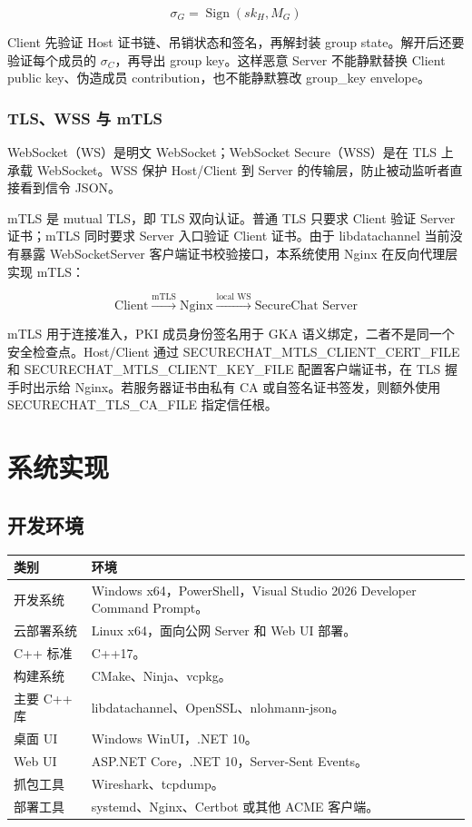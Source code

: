 \documentclass[UTF8,a4paper,12pt]{ctexart}
\begin{document}
\[
\sigma_G = \operatorname{Sign}(sk_H, M_G)
\]

Client 先验证 Host 证书链、吊销状态和签名，再解封装 group state。解开后还要验证每个成员的 \(\sigma_C\)，再导出 group key。这样恶意 Server 不能静默替换 Client public key、伪造成员 contribution，也不能静默篡改 group\_key envelope。

\subsubsection{TLS、WSS 与 mTLS}

WebSocket（WS）是明文 WebSocket；WebSocket Secure（WSS）是在 TLS 上承载 WebSocket。WSS 保护 Host/Client 到 Server 的传输层，防止被动监听者直接看到信令 JSON。

mTLS 是 mutual TLS，即 TLS 双向认证。普通 TLS 只要求 Client 验证 Server 证书；mTLS 同时要求 Server 入口验证 Client 证书。由于 libdatachannel 当前没有暴露 WebSocketServer 客户端证书校验接口，本系统使用 Nginx 在反向代理层实现 mTLS：

\[
\text{Client} \xrightarrow{\text{mTLS}} \text{Nginx} \xrightarrow{\text{local WS}} \text{SecureChat Server}
\]

mTLS 用于连接准入，PKI 成员身份签名用于 GKA 语义绑定，二者不是同一个安全检查点。Host/Client 通过 SECURECHAT\_MTLS\_CLIENT\_CERT\_FILE 和 SECURECHAT\_MTLS\_CLIENT\_KEY\_FILE 配置客户端证书，在 TLS 握手时出示给 Nginx。若服务器证书由私有 CA 或自签名证书签发，则额外使用 SECURECHAT\_TLS\_CA\_FILE 指定信任根。

\section{系统实现}

\subsection{开发环境}

\begin{longtable}{p{4cm}p{10cm}}
\toprule
类别 & 环境 \\
\midrule
开发系统 & Windows x64，PowerShell，Visual Studio 2026 Developer Command Prompt。\\
云部署系统 & Linux x64，面向公网 Server 和 Web UI 部署。\\
C++ 标准 & C++17。\\
构建系统 & CMake、Ninja、vcpkg。\\
主要 C++ 库 & libdatachannel、OpenSSL、nlohmann-json。\\
桌面 UI & Windows WinUI，.NET 10。\\
Web UI & ASP.NET Core，.NET 10，Server-Sent Events。\\
抓包工具 & Wireshark、tcpdump。\\
部署工具 & systemd、Nginx、Certbot 或其他 ACME 客户端。\\
\bottomrule
\end{longtable}
\end{document}
